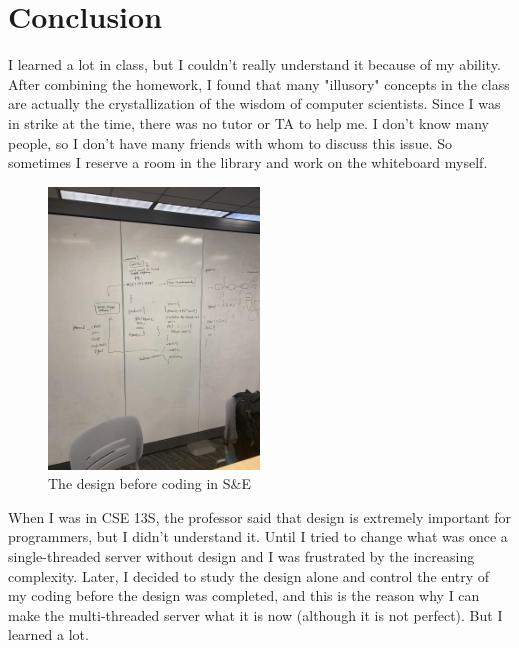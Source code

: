 \documentclass{article}
\begin{document}
\section{Conclusion}
    I learned a lot in class, but I couldn't really understand it because of my ability. After combining the homework, I found that many "illusory" concepts in the class are actually the crystallization of the wisdom of computer scientists. Since I was in strike at the time, there was no tutor or TA to help me. I don't know many people, so I don't have many friends with whom to discuss this issue. So sometimes I reserve a room in the library and work on the whiteboard myself.
    \begin{figure}[htbp]
        \centering
        \includegraphics[width=0.5\textwidth]{IMG_1179.jpg}
        \caption{The design before coding in S\&E}
        \label{fig:design}
    \end{figure}
    When I was in CSE 13S, the professor said that design is extremely important for programmers, but I didn't understand it. Until I tried to change what was once a single-threaded server without design and I was frustrated by the increasing complexity. Later, I decided to study the design alone and control the entry of my coding before the design was completed, and this is the reason why I can make the multi-threaded server what it is now (although it is not perfect). But I learned a lot.
\end{document}

